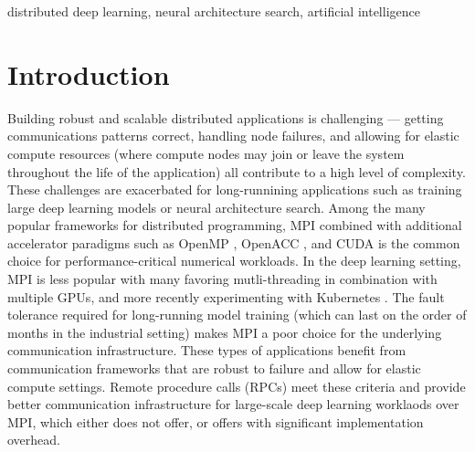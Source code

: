 \documentclass[conference]{IEEEtran}
\begin{document}
\begin{IEEEkeywords}
distributed deep learning, neural architecture search, artificial intelligence
\end{IEEEkeywords}

\section{Introduction}
Building robust and scalable distributed applications is challenging --- getting
communications patterns correct, handling node failures, and allowing for
elastic compute resources (where compute nodes may join or leave the system
throughout the life of the application) all contribute to a high level of
complexity. These challenges are exacerbated for long-runnining applications
such as training large deep learning models or neural architecture search. Among
the many popular frameworks for distributed programming, MPI
\cite{Forum:1994:MMI:898758} combined with additional accelerator paradigms such
as OpenMP \cite{Dagum:1998:OIA:615255.615542}, OpenACC
\cite{Wienke:2012:OFE:2402420.2402522}, and CUDA
\cite{Nickolls:2008:SPP:1365490.1365500} is the common choice for
performance-critical numerical workloads. In the deep learning setting, MPI is
less popular with many favoring mutli-threading in combination with multiple
GPUs, and more recently experimenting with Kubernetes \cite{8094194,
  8672301}. The fault tolerance required for long-running model training (which
can last on the order of months in the industrial setting) makes MPI a poor
choice for the underlying communication infrastructure. These types of applications
benefit from communication frameworks that are robust to failure and allow
for elastic compute settings. Remote procedure calls (RPCs) meet these
criteria and provide better communication infrastructure for large-scale
deep learning worklaods over MPI, which either does not offer, or offers with
significant implementation overhead.
\end{document}

